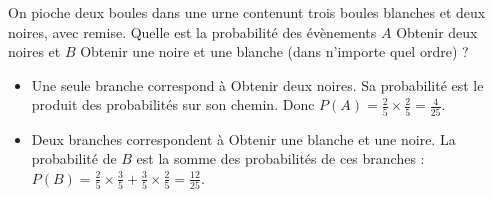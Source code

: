 \begin{exemple} On pioche deux boules dans une urne contenunt trois boules
  blanches et deux noires, avec remise. Quelle est la probabilité des
  évènements $A$ \og{}Obtenir deux noires\fg{} et $B$ \og{}Obtenir une noire et une
  blanche (dans n'importe quel ordre)\fg{} ?

  \begin{multicols}{2}
    \begin{center}
      \end{center}

      \columnbreak

      \begin{itemize}
        \item Une seule branche correspond à \og{}Obtenir deux noires\fg{}. Sa probabilité est le produit des probabilités sur son chemin. Donc $P(A)=\frac{2}{5}\times\frac{2}{5}=\frac{4}{25}$.
        \item Deux branches correspondent à \og{}Obtenir une blanche et une
          noire\fg{}. La probabilité de $B$ est la somme des probabilités de ces
          branches :
          $P(B)=\frac{2}{5}\times\frac{3}{5}+\frac{3}{5}\times\frac{2}{5}=\frac{12}{25}$.
      \end{itemize}
    \end{multicols}
\end{exemple}

